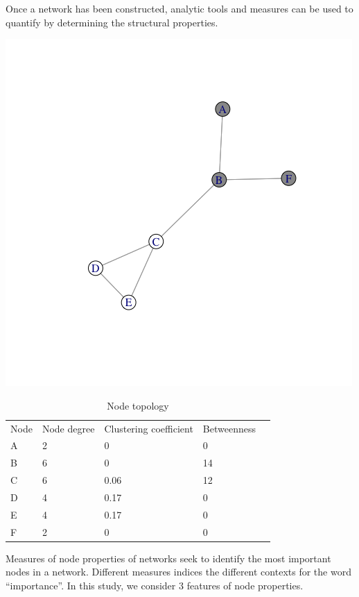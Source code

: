 Once a network has been constructed, analytic tools and measures can be used to quantify by determining the structural properties.

\includegraphics{figures/simgraph.png}

\begin{table}
\centering
\caption{Node topology}
\begin{tabular}{lllll}
Node & Node degree & Clustering coefficient & Betweenness   \\
A    & 2           & 0                      & 0             \\
B    & 6           & 0                      & 14            \\
C    & 6           & 0.06                   & 12            \\
D    & 4           & 0.17                   & 0             \\
E    & 4           & 0.17                   & 0             \\
F    & 2           & 0                      & 0            
\end{tabular}
\end{table}

Measures of node properties of networks seek to identify the most important nodes in a network. Different measures indices the different contexts for the word ``importance''. In this study, we consider 3 features of node properties. 

